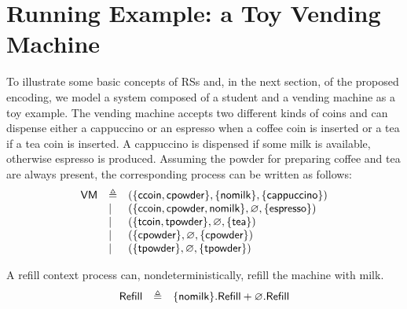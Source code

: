 
\section{Running Example: a Toy Vending Machine}\label{sec:student}

To illustrate some basic concepts of RSs and, in the next section, of the proposed \GROOVE encoding, we model a system composed of a student and a vending machine as a toy example.
The vending machine accepts two different kinds of coins and can dispense either a cappuccino or an espresso when a coffee coin is inserted or a tea if a tea coin is inserted. A cappuccino is dispensed if some milk is available, otherwise espresso is produced.
Assuming the powder for preparing coffee and tea are always present, the corresponding process can be written as follows:
\[
\begin{array}{lll}
\mathsf{VM} & \triangleq & (\{{\text{\sffamily ccoin}},{\text{\sffamily cpowder}}\},\{{\text{\sffamily nomilk}}\},\{{\text{\sffamily cappuccino}}\})\\
& | & (\{{\text{\sffamily ccoin}},{\text{\sffamily cpowder}},{\text{\sffamily nomilk}}\},\varnothing,\{{\text{\sffamily espresso}}\})\\
& | & (\{{\text{\sffamily tcoin}},{\text{\sffamily tpowder}}\},\varnothing,\{{\text{\sffamily tea}}\})\\
& | & (\{{\text{\sffamily cpowder}}\},\varnothing,\{{\text{\sffamily cpowder}}\})\\
& | & (\{{\text{\sffamily tpowder}}\},\varnothing,\{{\text{\sffamily tpowder}}\})\\
\end{array}
\]

A refill context process can, nondeterministically, refill the machine with milk.
\[
\begin{array}{lll}
\mathsf{Refill} & \triangleq & \{{\text{\sffamily nomilk}}\}.\mathsf{Refill}
+ \varnothing.\mathsf{Refill}
\end{array}
\]

